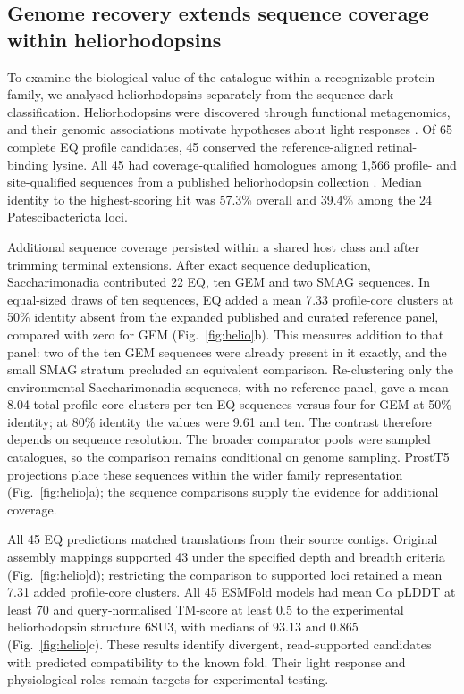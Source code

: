 \documentclass[11pt]{article}
\begin{document}
\subsection*{Genome recovery extends sequence coverage within heliorhodopsins}

To examine the biological value of the catalogue within a recognizable protein family, we analysed heliorhodopsins separately from the sequence-dark classification. Heliorhodopsins were discovered through functional metagenomics, and their genomic associations motivate hypotheses about light responses \citep{pushkarev2018heliorhodopsin,bulzu2021heliorhodopsin}. Of 65 complete EQ profile candidates, 45 conserved the reference-aligned retinal-binding lysine. All 45 had coverage-qualified homologues among 1{,}566 profile- and site-qualified sequences from a published heliorhodopsin collection \citep{bulzu2021heliorhodopsin}. Median identity to the highest-scoring hit was 57.3\% overall and 39.4\% among the 24 Patescibacteriota loci.

Additional sequence coverage persisted within a shared host class and after trimming terminal extensions. After exact sequence deduplication, Saccharimonadia contributed 22 EQ, ten GEM and two SMAG sequences. In equal-sized draws of ten sequences, EQ added a mean 7.33 profile-core clusters at 50\% identity absent from the expanded published and curated reference panel, compared with zero for GEM (Fig.~\ref{fig:helio}b). This measures addition to that panel: two of the ten GEM sequences were already present in it exactly, and the small SMAG stratum precluded an equivalent comparison. Re-clustering only the environmental Saccharimonadia sequences, with no reference panel, gave a mean 8.04 total profile-core clusters per ten EQ sequences versus four for GEM at 50\% identity; at 80\% identity the values were 9.61 and ten. The contrast therefore depends on sequence resolution. The broader comparator pools were sampled catalogues, so the comparison remains conditional on genome sampling. ProstT5 projections place these sequences within the wider family representation (Fig.~\ref{fig:helio}a); the sequence comparisons supply the evidence for additional coverage.

All 45 EQ predictions matched translations from their source contigs. Original assembly mappings supported 43 under the specified depth and breadth criteria (Fig.~\ref{fig:helio}d); restricting the comparison to supported loci retained a mean 7.31 added profile-core clusters. All 45 ESMFold models had mean C$\alpha$ pLDDT at least 70 and query-normalised TM-score at least 0.5 to the experimental heliorhodopsin structure 6SU3, with medians of 93.13 and 0.865 (Fig.~\ref{fig:helio}c). These results identify divergent, read-supported candidates with predicted compatibility to the known fold. Their light response and physiological roles remain targets for experimental testing.
\end{document}

